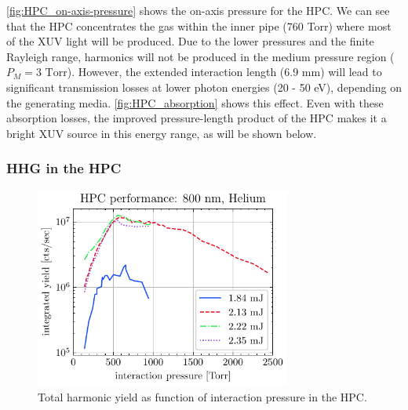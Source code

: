
\cref{fig:HPC_on-axis-pressure} shows the on-axis pressure for the HPC. We can see that the HPC concentrates the gas within the inner pipe (760 Torr) where most of the XUV light will be produced. Due to the lower pressures and the finite Rayleigh range, harmonics will not be produced in the medium pressure region ($P_M = 3 \textrm{ Torr}$). However, the extended interaction length (6.9 mm) will lead to significant transmission losses at lower photon energies (20 - 50 eV), depending on the generating media. \cref{fig:HPC_absorption} shows this effect. Even with these absorption losses, the improved pressure-length product of the HPC makes it a bright XUV source in this energy range, as will be shown below.

\subsubsection{HHG in the HPC}

\begin{figure}
	\centering
	\includegraphics[width=0.75\textwidth]{figures/chap3/HPC_P_scaling_He800.pdf}
	\caption{Total harmonic yield as function of interaction pressure in the HPC.}
	\label{fig:HPC_performance}
\end{figure}

